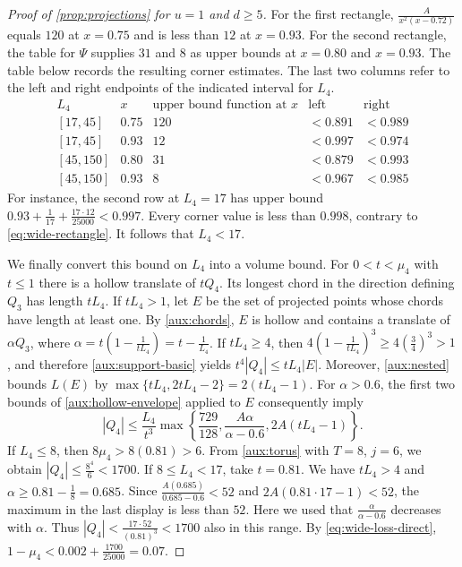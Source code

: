 \documentclass[reqno, 11pt]{article}
\numberwithin{equation}{section}
\theoremstyle{definition}
\begin{document}
\begin{proof}[Proof of \cref{prop:projections} for $u=1$ and $d\ge5$]
For the first rectangle, $\frac{A}{x^2(x-0.72)}$ equals $120$ at
$x=0.75$ and is less than $12$ at $x=0.93$. For the second rectangle,
the table for $\Psi$ supplies $31$ and $8$ as upper bounds at
$x=0.80$ and $x=0.93$. The table below records the resulting corner
estimates. The last two columns refer to the left and right endpoints
of the indicated interval for $L_4$.
\[
\begin{array}{c|c|c|cc}
 L_4 & x & \text{upper bound function at }x
     & \text{left} & \text{right}\\ \hline
 {[17,45]}  &0.75&120&<0.891&<0.989\\
 {[17,45]}  &0.93&12 &<0.997&<0.974\\
 {[45,150]} &0.80&31 &<0.879&<0.993\\
 {[45,150]} &0.93&8  &<0.967&<0.985
\end{array}
\]
For instance, the second row at $L_4=17$ has upper bound
$0.93+\frac{1}{17}+\frac{17\cdot12}{25000}<0.997$.
Every corner value is less than $0.998$, contrary to
\eqref{eq:wide-rectangle}. It follows that $L_4<17$.

We finally convert this bound on $L_4$ into a volume bound. For
$0<t<\mu_4$ with $t\le1$ there is a hollow translate of $tQ_4$.
Its longest chord in the direction defining $Q_3$ has length $tL_4$.
If $tL_4>1$, let $E$ be the set of projected points whose chords have
length at least one. By \cref{aux:chords}, $E$ is hollow and contains
a translate of $\alpha Q_3$, where
$\alpha=t(1-\frac{1}{tL_4})=t-\frac{1}{L_4}$. If $tL_4\ge4$,
then $4(1-\frac{1}{tL_4})^3\ge4(\frac{3}{4})^3>1$, and therefore
\eqref{aux:support-basic} yields $t^4|Q_4|\le tL_4|E|$. Moreover,
\eqref{aux:nested} bounds $L(E)$ by $\max\{tL_4,2tL_4-2\}=2(tL_4-1)$.
For $\alpha>0.6$, the first two bounds of \cref{aux:hollow-envelope}
applied to $E$ consequently imply
\[
 |Q_4|\le\frac{L_4}{t^3}
 \max\left\{\frac{729}{128},\frac{A\alpha}{\alpha-0.6},2A(tL_4-1)\right\}.
\]
If $L_4\le8$, then $8\mu_4>8(0.81)>6$. From \cref{aux:torus} with
$T=8$, $j=6$, we obtain $|Q_4|\le\frac{8^4}{6}<1700$.
If $8\le L_4<17$, take $t=0.81$. We have $tL_4>4$ and
$\alpha\ge0.81-\frac{1}{8}=0.685$. Since
$\frac{A(0.685)}{0.685-0.6}<52$ and $2A(0.81\cdot17-1)<52$,
the maximum in the last display is less than $52$. Here we used
that $\frac{\alpha}{\alpha-0.6}$ decreases with $\alpha$.
Thus $|Q_4|<\frac{17\cdot52}{(0.81)^3}<1700$ also in this range.
By \eqref{eq:wide-loss-direct},
$1-\mu_4<0.002+\frac{1700}{25000}=0.07$.


\end{proof}
\end{document}
